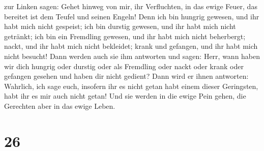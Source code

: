 zur Linken sagen: Gehet hinweg von mir, ihr Verfluchten, in das ewige
Feuer, das bereitet ist dem Teufel und seinen Engeln! 
Denn ich bin hungrig gewesen, und ihr habt mich nicht gespeist; ich bin
durstig gewesen, und ihr habt mich nicht getränkt;  ich
bin ein Fremdling gewesen, und ihr habt mich nicht beherbergt; nackt,
und ihr habt mich nicht bekleidet; krank und gefangen, und ihr habt mich
nicht besucht!  Dann werden auch sie ihm antworten und
sagen: Herr, wann haben wir dich hungrig oder durstig oder als Fremdling
oder nackt oder krank oder gefangen gesehen und haben dir nicht gedient?
 Dann wird er ihnen antworten: Wahrlich, ich sage euch,
insofern ihr es nicht getan habt einem dieser Geringsten, habt ihr es
mir auch nicht getan!  Und sie werden in die ewige Pein
gehen, die Gerechten aber in das ewige Leben.

\hypertarget{section-25}{%
\section{26}\label{section-25}}

